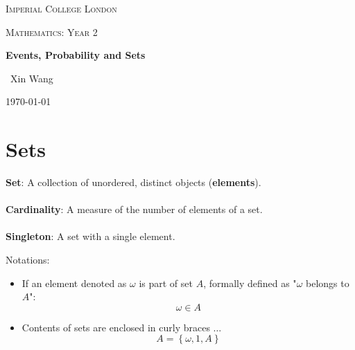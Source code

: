 \documentclass[10pt,a4paper]{article}
\begin{document}
\begin{titlepage}
	\centering
	{\scshape\LARGE Imperial College London \par}
	\vspace{1cm}
	{\scshape\Large Mathematics: Year 2\par}
	\vspace{1.5cm}
	{\huge\bfseries Events, Probability and Sets\par}
	\vspace{2cm}
	{\Large\ Xin Wang }
	\vfill
	{\large \today\par}
\end{titlepage}

\begin{abstract}
Engineering is a profession founded upon experimentation, the data it produces, and how it is
extracted and analysed. 

\textbf{Probability} is the mathematical science of dealing with uncertainty - it provides engineers with the
rules for analyzing and understanding ignorance about uncertain situations.

\textbf{Statistics} is the science of reasoning about data in the presence of uncertainty that can
arise for numerous reason in the real world such as noise. In the real world, data collected is composed of signal
and noise that needs to be spilt and analysed.
\end{abstract}

\tableofcontents
\pagebreak

\section{Sets}

\begin{tcolorbox}[breakable,colback=white]
\textbf{Set}: A collection of unordered, distinct objects (\textbf{elements}).
\\
\\
\textbf{Cardinality}: A measure of the number of elements of a set.
\\
\\
\textbf{Singleton}: A set with a single element.
\end{tcolorbox}

Notations:
\begin{itemize}
    \item If an element denoted as $\omega$ is part of set $A$, formally defined as "$\omega$ belongs to $A$":
    $$
        \omega \in A
    $$
    
    \item Contents of sets are enclosed in curly braces ${\dots}$
    $$
        A = \left\{\omega, 1, A\right\}
    $$
\end{itemize}
\end{document}
